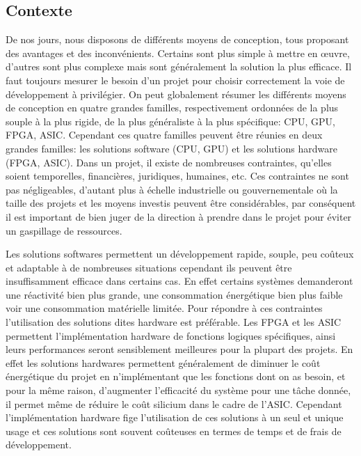 \documentclass[a4paper,12pt]{article}
\begin{document}
\subsection{Contexte}
De nos jours, nous disposons de différents moyens de conception, tous proposant des avantages et des inconvénients. Certains sont plus simple à mettre en œuvre, d'autres sont plus complexe mais sont généralement la solution la plus efficace. Il faut toujours mesurer le besoin d'un projet pour choisir correctement la voie de développement à privilégier.
    On peut globalement résumer les différents moyens de conception en quatre grandes familles, respectivement ordonnées de la plus souple à la plus rigide, de la plus généraliste à la plus spécifique: CPU, GPU, FPGA, ASIC. Cependant ces quatre familles peuvent être réunies en deux grandes familles: les solutions software (CPU, GPU) et les solutions hardware (FPGA, ASIC).
    Dans un projet, il existe de nombreuses contraintes, qu'elles soient temporelles, financières, juridiques, humaines, etc. Ces contraintes ne sont pas négligeables, d'autant plus à échelle industrielle ou gouvernementale où la taille des projets et les moyens investis peuvent être considérables, par conséquent il est important de bien juger de la direction à prendre dans le projet pour éviter un gaspillage de ressources. \newline

    
    Les solutions softwares permettent un développement rapide, souple, peu coûteux et adaptable à de nombreuses situations cependant ils peuvent être insuffisamment efficace dans certains cas. En effet certains systèmes demanderont une réactivité bien plus grande, une consommation énergétique bien plus faible voir une consommation matérielle limitée. Pour répondre à ces contraintes l'utilisation des solutions dites hardware est préférable. Les FPGA et les ASIC permettent l'implémentation hardware de fonctions logiques spécifiques, ainsi leurs performances seront sensiblement meilleures pour la plupart des projets. En effet les solutions hardwares permettent généralement de diminuer le coût énergétique du projet en n'implémentant que les fonctions dont on as besoin, et pour la même raison, d'augmenter l'efficacité du système pour une tâche donnée, il permet même de réduire le coût silicium dans le cadre de l'ASIC. Cependant l'implémentation hardware fige l'utilisation de ces solutions à un seul et unique usage et ces solutions sont souvent coûteuses en termes de temps et de frais de développement.\newline
    
\end{document}
